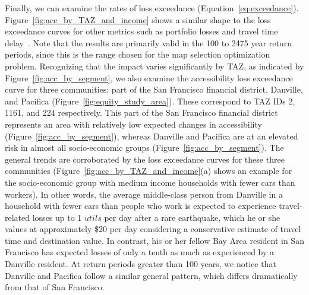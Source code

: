 Finally, we can examine the rates of loss exceedance (Equation~\ref{eq:exceedance}). Figure~\ref{fig:acc_by_TAZ_and_income} shows a similar shape to the loss exceedance curves for other metrics such as portfolio losses and travel time delay~\cite{miller_seismic_2014}. Note that the results are primarily valid in the 100 to 2475 year return periods, since this is the range chosen for the map selection optimization problem. %
Recognizing that the impact varies significantly by TAZ, as indicated by Figure~\ref{fig:acc_by_segment},
we also examine the accessibility loss exceedance curve for three communities: part of the San Francisco financial district, Danville, and Pacifica (Figure~\ref{fig:equity_study_area}). These correspond to TAZ IDs 2, 1161, and 224 respectively. This part of the San Francisco financial district  represents an area with relatively low expected changes in accessibility (Figure~\ref{fig:acc_by_segment}), whereas Danville and Pacifica are at an elevated risk in almost all socio-economic groups (Figure~\ref{fig:acc_by_segment}). 
The general trends are corroborated by the loss exceedance curves for these three communities (Figure~\ref{fig:acc_by_TAZ_and_income}{(a)} shows an example for the socio-economic group with medium income households with fewer cars than workers). In other words, the average middle-class person from Danville in a household with fewer cars than people who work is expected to experience travel-related losses up to 1 $utils$ per day after a rare earthquake, which he or she values at approximately \$20 per day considering a conservative estimate of travel time and destination value. In contrast, his or her fellow Bay Area resident in San Francisco has expected losses of only a tenth as much as experienced by a Danville resident. At return periods greater than 100 years, we notice that Danville and Pacifica follow a similar general pattern, which differs dramatically from that of San Francisco. 

